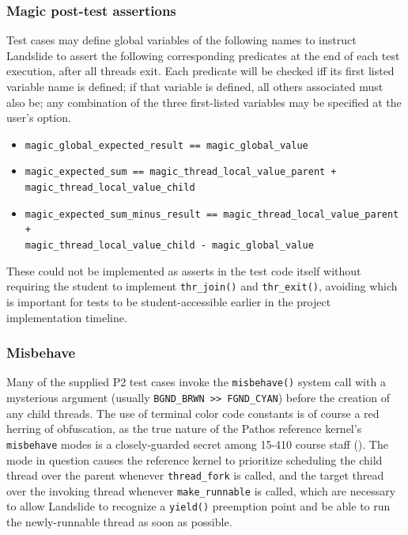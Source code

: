 \subsubsection{Magic post-test assertions}

Test cases may define global variables of the following names
to instruct Landslide to assert the following corresponding predicates at the end of each test execution,
after all threads exit.
Each predicate will be checked iff its first listed variable name is defined;
if that variable is defined, all others associated must also be;
any combination of the three first-listed variables may be specified at the user's option.
\begin{itemize}
	\item {\tt magic\_global\_expected\_result == magic\_global\_value}
	\item {\tt magic\_expected\_sum == magic\_thread\_local\_value\_parent +} \\ {\tt magic\_thread\_local\_value\_child}
	\item {\tt magic\_expected\_sum\_minus\_result == magic\_thread\_local\_value\_parent +} \\ {\tt magic\_thread\_local\_value\_child - magic\_global\_value}
\end{itemize}
These could not be implemented as asserts in the test code itself
without requiring the student to implement {\tt thr\_join()} and {\tt thr\_exit()},
avoiding which is important for tests to be student-accessible earlier in the project implementation timeline.

\subsubsection{Misbehave}
\label{sec:landslide-friendly-misbehave}

Many of the supplied P2 test cases invoke the {\tt misbehave()} system call
with a mysterious argument (usually {\tt BGND\_BRWN >> FGND\_CYAN})
before the creation of any child threads.
The use of terminal color code constants is of course a red herring of obfuscation,
as the true nature of the Pathos reference kernel's {\tt misbehave} modes
is a closely-guarded secret among 15-410 course staff (\sect{\ref{sec:410-secrecy}}).
The mode in question causes the reference kernel to prioritize scheduling the child thread over the parent
whenever {\tt thread\_fork} is called,
and the target thread over the invoking thread
whenever {\tt make\_runnable} is called,
which are necessary to allow Landslide to recognize a {\tt yield()} preemption point
and be able to run the newly-runnable thread as soon as possible.

